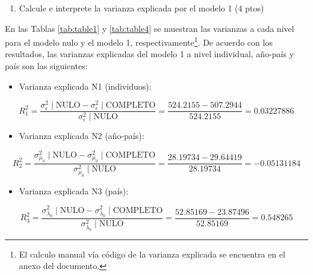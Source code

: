 \documentclass[
  12pt,
  a4paper,
]{article}
\providecommand{\tightlist}{%
  \setlength{\itemsep}{0pt}\setlength{\parskip}{0pt}}
\begin{document}
\begin{enumerate}
\def\labelenumi{\alph{enumi})}
\setcounter{enumi}{1}
\tightlist
\item
  Calcule e interprete la varianza explicada por el modelo 1 (4 ptos)
\end{enumerate}

En las Tablas \ref{tab:table1} y \ref{tab:table4} se muestran las varianzas a cada nivel para el modelo nulo y el modelo 1, respectivamente\footnote{El calculo manual vía código de la varianza explicada se encuentra en el anexo del documento.}. De acuerdo con los resultados, las varianzas explicadas del modelo 1 a nivel individual, año-país y país son las siguientes:

\begin{itemize}
\tightlist
\item
  Varianza explicada N1 (individuos):
\end{itemize}

\[
R^2_1 = \frac{\sigma^2_{\epsilon}\mid\text{NULO} - \sigma^2_{\epsilon}\mid\text{COMPLETO}}{\sigma^2_{\epsilon}\mid\text{NULO}} = \frac{524.2155- 507.2944}{524.2155} =  0.03227886
\]

\begin{itemize}
\tightlist
\item
  Varianza explicada N2 (año-país):
\end{itemize}

\[ 
R^2_2 = \frac{\sigma^2_{\mu_0}\mid\text{NULO} - \sigma^2_{\mu_0}\mid\text{COMPLETO}}{\sigma^2_{\mu_0}\mid\text{NULO}} = \frac{28.19734-29.64419}{28.19734} =  -0.05131184
\]

\begin{itemize}
\tightlist
\item
  Varianza explicada N3 (país):
\end{itemize}

\[ 
R^2_3 = \frac{\sigma^2_{\lambda_0}\mid\text{NULO} - \sigma^2_{\lambda_0}\mid\text{COMPLETO}}{\sigma^2_{\lambda_0}\mid\text{NULO}} = \frac{52.85169-23.87496}{52.85169} =  0.548265
\]
\end{document}
